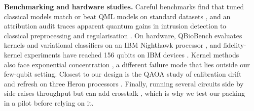 \textbf{Benchmarking and hardware studies.} Careful benchmarks find that tuned classical models
match or beat QML models on standard datasets \cite{bowles2024benchmarking}, and an attribution
audit traces apparent quantum gains in intrusion detection to classical preprocessing and
regularisation \cite{gillani2026nids}. On hardware, QBioBench evaluates kernels and variational
classifiers on an IBM Nighthawk processor \cite{qbiobench2026}, and fidelity-kernel experiments
have reached 156 qubits on IBM devices \cite{covariant2025concentration}. Kernel methods also
face exponential concentration
\cite{thanasilp2024concentration,shaydulin2022bandwidth,bandwidth2025similarity}, a different
failure mode that lies outside our few-qubit setting. Closest to our design is the QAOA study of
calibration drift and refresh on three Heron processors \cite{qaoa2026drift}. Finally, running
several circuits side by side raises throughput but can add crosstalk
\cite{ohkura2022simultaneous,murali2020crosstalk,parallelqml2024}, which is why we test our
packing in a pilot before relying on it.
